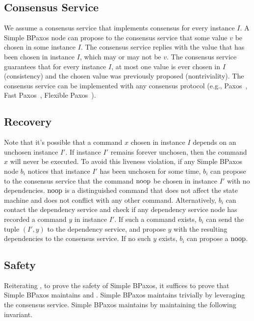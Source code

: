 \subsection{Consensus Service}
We assume a consensus service that implements consensus for every instance $I$.
A Simple BPaxos node can propose to the consensus service that some value $v$
be chosen in some instance $I$. The consensus service replies with the value
that has been chosen in instance $I$, which may or may not be $v$. The
consensus service guarantees that for every instance $I$, at most one value is
ever chosen in $I$ (consistency) and the chosen value was previously proposed
(nontriviality). The consensus service can be implemented with any consensus
protocol (e.g., Paxos~\cite{lamport1998part, lamport2001paxos}, Fast
Paxos~\cite{lamport2006fast}, Flexible Paxos~\cite{howard2016flexible}).

\subsection{Recovery}
Note that it's possible that a command $x$ chosen in instance $I$ depends on an
unchosen instance $I'$. If instance $I'$ remains forever unchosen, then the
command $x$ will never be executed. To avoid this liveness violation, if any
Simple BPaxos node $b_i$ notices that instance $I'$ has been unchosen for some
time, $b_i$ can propose to the consensus service that the command $\text{noop}$ be
chosen in instance $I'$ with no dependencies. $\text{noop}$ is a distinguished
command that does not affect the state machine and does not conflict with any
other command.
%
Alternatively, $b_i$ can contact the dependency service and check if any
dependency service node has recorded a command $y$ in instance $I'$. If such a
command exists, $b_i$ can send the tuple $(I', y)$ to the dependency service,
and propose $y$ with the resulting dependencies to the consensus service. If no
such $y$ exists, $b_i$ can propose a $\text{noop}$.

\subsection{Safety}
Reiterating , to prove the safety of Simple BPaxos, it
suffices to prove that Simple BPaxos maintains  and
.
%
Simple BPaxos maintains  trivially by leveraging the
consensus service. Simple BPaxos maintains  by
maintaining the following invariant.

